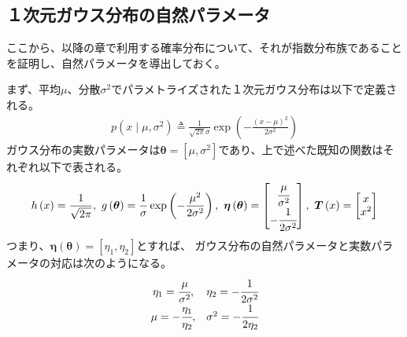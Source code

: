 \documentclass[oneside,onecolumn]{jlreq}
\theoremstyle{plain}
\begin{document}
\subsection{１次元ガウス分布の自然パラメータ}
ここから、以降の章で利用する確率分布について、それが指数分布族であることを証明し、自然パラメータを導出しておく。

まず、平均$\mu$、分散$\sigma^2$でパラメトライズされた１次元ガウス分布は以下で定義される。
\begin{align}
    p\left(x\mid \mu, \sigma^2\right) \triangleq \frac{1}{\sqrt{2\pi}\sigma}\exp\left(-\frac{(x-\mu)^2}{2\sigma^2}\right)
\end{align}
ガウス分布の実数パラメータは$\bm{\theta} = \left[\mu, \sigma^2\right]$であり、上で述べた既知の関数はそれぞれ以下で表される。
\begin{align}
    h\left(x\right) = \frac{1}{\sqrt{2\pi}},
    ~g\left(\bm{\theta}\right) = \frac{1}{\sigma}\exp\left(-\frac{\mu^2}{2\sigma^2}\right),
    ~\bm{\eta}\left(\bm{\theta}\right) =
    \begin{bmatrix}
        \cfrac{\mu}{\sigma^2} \\
        -\cfrac{1}{2\sigma^2}
    \end{bmatrix},
    ~\bm{T}\left(x\right) =
    \begin{bmatrix}
        x \\
        x^2
    \end{bmatrix}
\end{align}
つまり、$\bm{\eta}\left(\bm{\theta}\right)=\left[\eta_1, \eta_2\right]$とすれば、
ガウス分布の自然パラメータと実数パラメータの対応は次のようになる。
\begin{align}
    \begin{matrix}
        \eta_1 = \cfrac{\mu}{\sigma^2}, & \eta_2 = -\cfrac{1}{2\sigma^2} \\
        \mu = -\cfrac{\eta_1}{\eta_2}, & \sigma^2 = -\cfrac{1}{2\eta_2}
    \end{matrix}
\end{align}
\end{document}
